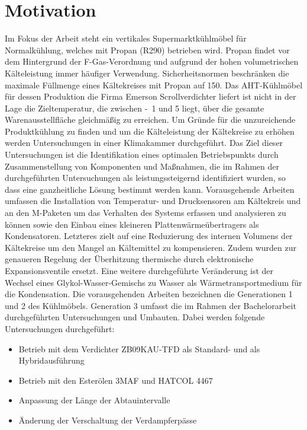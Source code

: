 
\chapter{Motivation}
\label{cha:Motivation}

Im Fokus der Arbeit steht ein vertikales Supermarktkühlmöbel für Normalkühlung, welches mit Propan (R290) betrieben wird\cite{DINDeutschesInstitutfurNormunge.V..b}. Propan findet vor dem Hintergrund der F-Gas-Verordnung und aufgrund der hohen volumetrischen Kälteleistung immer häufiger Verwendung\cite{EUParlamentRat.2006}\cite{Huber.2016}\cite{Moons.2013}. Sicherheitsnormen beschränken die maximale Füllmenge eines Kältekreises mit Propan auf \unit{150}{\gram}\cite{DINDeutschesInstitutfurNormunge.V..2014b}. Das AHT-Kühlmöbel für dessen Produktion die Firma Emerson Scrollverdichter liefert ist nicht in der Lage die Zieltemperatur, die zwischen \unit{-1}{\celsius} und \unit{5}{\celsius} liegt, über die gesamte Warenausstellfläche gleichmäßig zu erreichen. Um Gründe für die unzureichende Produktkühlung zu finden und um die Kälteleistung der Kältekreise zu erhöhen werden Untersuchungen in einer Klimakammer durchgeführt. Das Ziel dieser Untersuchungen ist die Identifikation eines optimalen Betriebspunkts durch Zusammenstellung von Komponenten und Maßnahmen, die im Rahmen der durchgeführten Untersuchungen als leistungssteigernd identifiziert wurden, so dass eine ganzheitliche Lösung bestimmt werden kann. 
Vorausgehende Arbeiten umfassen die Installation von Temperatur- und Drucksensoren am Kältekreis und an den M-Paketen um das Verhalten des Systems erfassen und analysieren zu können sowie den Einbau eines kleineren Plattenwärmeübertragers als Kondensatoren. Letzteres zielt auf eine Reduzierung des internen Volumens der Kältekreise um den Mangel an Kältemittel zu kompensieren. Zudem wurden zur genaueren Regelung der Überhitzung thermische durch elektronische Expansionsventile ersetzt. Eine weitere durchgeführte Veränderung ist der Wechsel eines Glykol-Wasser-Gemischs zu Wasser als Wärmetransportmedium für die Kondensation.
Die vorausgehenden Arbeiten bezeichnen die Generationen 1 und 2 des Kühlmöbels.
Generation 3 umfasst die im Rahmen der Bachelorarbeit durchgeführten Untersuchungen und Umbauten.
Dabei werden folgende Untersuchungen durchgeführt:

\begin{itemize} 
\item Betrieb mit dem Verdichter ZB09KAU-TFD als Standard- und als Hybridausführung
\item Betrieb mit den Esterölen 3MAF und HATCOL 4467
\item Anpassung der Länge der Abtauintervalle
\item Änderung der Verschaltung der Verdampferpässe
\end{itemize}

